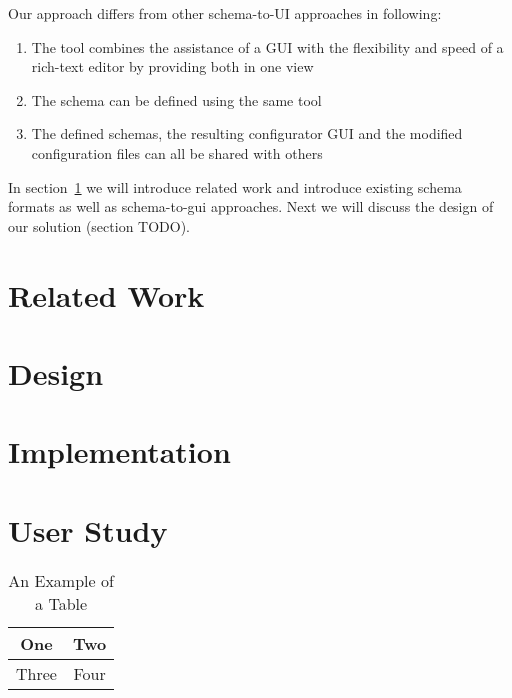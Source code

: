 \documentclass[lettersize,journal]{IEEEtran}
\begin{document}
 Our approach differs from other schema-to-UI approaches in following:

 \begin{enumerate}
  \item The tool combines the assistance of a GUI with the flexibility and speed of a rich-text editor by providing both in one view
  \item The schema can be defined using the same tool
  \item The defined schemas, the resulting configurator GUI and the modified configuration files can all be shared with others
 \end{enumerate}


 In section~\ref{sec:research} we will introduce related work and introduce existing schema formats as well as schema-to-gui approaches.
 Next we will discuss the design of our solution (section TODO).




 \section{Related Work}\label{sec:research}
 


 \section{Design}\label{sec:design}
 


 \section{Implementation}\label{sec:implementation}
 

 \section{User Study}\label{user_study}
 

 \begin{table}[!t]
  \caption{An Example of a Table\label{tab:table1}}
  \centering
  \begin{tabular}{|c||c|}
   \hline
   One   & Two  \\
   \hline
   Three & Four \\
   \hline
  \end{tabular}
 \end{table}
\end{document}
